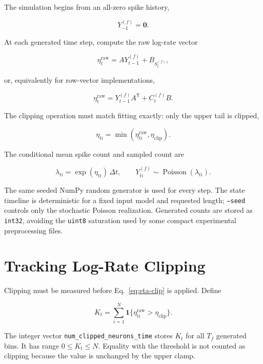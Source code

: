 \documentclass[11pt]{article}
\begin{document}
The simulation begins from an all-zero spike history,

\[
Y^{(f)}_{-1}=\bm{0}.
\]

At each generated time step, compute the raw log-rate vector

\begin{equation}
\label{eq:raw-eta}
\eta^{\mathrm{raw}}_t
= A Y^{(f)}_{t-1}+B_{S^{(f)}_t},
\end{equation}

or, equivalently for row-vector implementations,

\[
\eta^{\mathrm{raw}}_t
=Y^{(f)}_{t-1}A^{\mathsf T}+C^{(f)}_tB.
\]

The clipping operation must match fitting exactly: only the upper tail is
clipped,

\begin{equation}
\label{eq:eta-clip}
\eta_{ti}=\min\left(\eta^{\mathrm{raw}}_{ti},
\eta_{\mathrm{clip}}\right).
\end{equation}

The conditional mean spike count and sampled count are

\begin{equation}
\label{eq:poisson-forward}
\lambda_{ti}=\exp(\eta_{ti})\,\Delta t,
\qquad
Y^{(f)}_{ti}\sim\operatorname{Poisson}(\lambda_{ti}).
\end{equation}

The same seeded NumPy random generator is used for every step. The state
timeline is deterministic for a fixed input model and requested length;
\texttt{--seed} controls only the stochastic Poisson realization. Generated
counts are stored as \texttt{int32}, avoiding the \texttt{uint8} saturation
used by some compact experimental preprocessing files.

\section{Tracking Log-Rate Clipping}
\label{sec:clipping}

Clipping must be measured before Eq.~\eqref{eq:eta-clip} is applied. Define

\begin{equation}
\label{eq:clip-count}
K_t=\sum_{i=1}^{N}
\mathbf{1}\{\eta^{\mathrm{raw}}_{ti}>\eta_{\mathrm{clip}}\}.
\end{equation}

The integer vector \texttt{num\_clipped\_neurons\_time} stores \(K_t\) for
all \(T_f\) generated bins. It has range \(0\le K_t\le N\). Equality with
the threshold is not counted as clipping because the value is unchanged by
the upper clamp.
\end{document}

